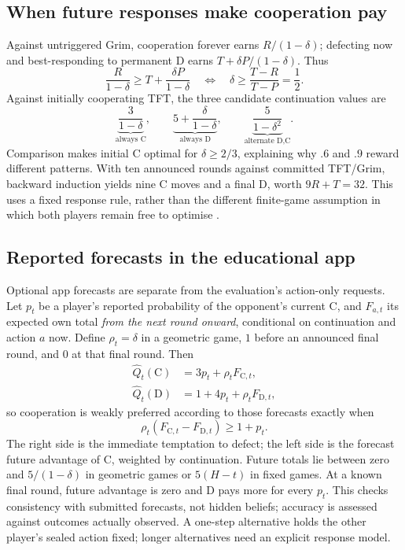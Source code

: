 \documentclass[11pt,a4paper]{article}
\newcommand{\C}{\mathrm C}
\newcommand{\D}{\mathrm D}
\begin{document}
\subsection{When future responses make cooperation pay}
Against untriggered Grim, cooperation forever earns $R/(1-\delta)$; defecting
now and best-responding to permanent D earns $T+\delta P/(1-\delta)$. Thus
\[
\frac{R}{1-\delta}\geq T+\frac{\delta P}{1-\delta}
\quad\Longleftrightarrow\quad
\delta\geq\frac{T-R}{T-P}=\frac12.
\]
Against initially cooperating TFT, the three candidate continuation values are
\[
\underbrace{\frac3{1-\delta}}_{\text{always C}},\qquad
\underbrace{5+\frac\delta{1-\delta}}_{\text{always D}},\qquad
\underbrace{\frac5{1-\delta^2}}_{\text{alternate D,C}}.
\]
Comparison makes initial C optimal for $\delta\geq2/3$, explaining why $.6$
and $.9$ reward different patterns. With ten announced rounds against committed
TFT/Grim, backward induction yields nine C moves and a final D, worth
$9R+T=32$. This uses a fixed response rule, rather than the different
finite-game assumption in which both players remain free to optimise
\cite[Sections 4.1 and 5.1--5.2]{rasmusen}.

\subsection{Reported forecasts in the educational app}
Optional app forecasts are separate from the evaluation's action-only requests.
Let $p_t$ be a player's reported probability of the opponent's current C, and
$F_{a,t}$ its expected own total \emph{from the next round onward}, conditional
on continuation and action $a$ now. Define $\rho_t=\delta$ in a geometric game,
$1$ before an announced final round, and $0$ at that final round. Then
\begin{align*}
\widehat Q_t(\C)&=3p_t+\rho_tF_{\C,t},\\
\widehat Q_t(\D)&=1+4p_t+\rho_tF_{\D,t},
\end{align*}
so cooperation is weakly preferred according to those forecasts exactly when
\[
\rho_t(F_{\C,t}-F_{\D,t})\geq1+p_t.
\]
The right side is the immediate temptation to defect; the left side is the
forecast future advantage of C, weighted by continuation. Future totals lie
between zero and $5/(1-\delta)$ in geometric games or $5(H-t)$ in fixed games.
At a known final round, future advantage is zero and D pays more for every
$p_t$. This checks consistency with submitted forecasts, not hidden beliefs;
accuracy is assessed against outcomes actually observed. A one-step alternative
holds the other player's sealed action fixed; longer alternatives need an
explicit response model.
\end{document}
